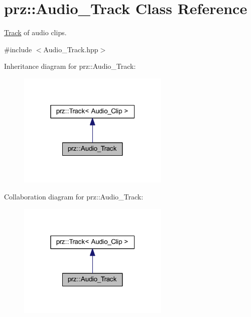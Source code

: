 \hypertarget{classprz_1_1_audio___track}{}\section{prz\+::Audio\+\_\+\+Track Class Reference}
\label{classprz_1_1_audio___track}


\mbox{\hyperlink{classprz_1_1_track}{Track}} of audio clips.  




{\ttfamily \#include $<$Audio\+\_\+\+Track.\+hpp$>$}



Inheritance diagram for prz\+::Audio\+\_\+\+Track\+:
\nopagebreak
\begin{figure}[H]
\begin{center}
\leavevmode
\includegraphics[width=205pt]{classprz_1_1_audio___track__inherit__graph}
\end{center}
\end{figure}


Collaboration diagram for prz\+::Audio\+\_\+\+Track\+:
\nopagebreak
\begin{figure}[H]
\begin{center}
\leavevmode
\includegraphics[width=205pt]{classprz_1_1_audio___track__coll__graph}
\end{center}
\end{figure}
